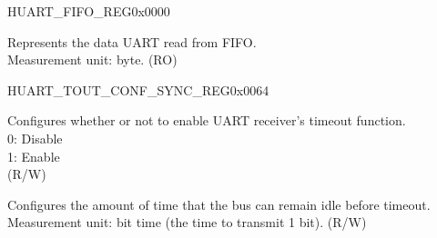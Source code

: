 \begin{register}{H}{UART\_FIFO\_REG}{0x0000}\label{regdesc:UARTFIFOREG}
%
%
\regnewline%
\begin{regdesc}\begin{reglist}
\label{fielddesc:UARTRXFIFORDBYTE}\item [UART\_RXFIFO\_RD\_BYTE] Represents the data UART  read from FIFO.\\
Measurement unit: byte. (RO)
\end{reglist}\end{regdesc}
\end{register}


\begin{register}{H}{UART\_TOUT\_CONF\_SYNC\_REG}{0x0064}\label{regdesc:UARTTOUTCONFSYNCREG}
%
%
%
%
\regnewline%
\begin{regdesc}\begin{reglist}
\label{fielddesc:UARTRXTOUTEN}\item [UART\_RX\_TOUT\_EN] Configures whether or not to enable UART receiver's timeout function.\\
0: Disable\\
1: Enable\\(R/W)
\label{fielddesc:UARTRXTOUTTHRHD}\item [UART\_RX\_TOUT\_THRHD] Configures the amount of time that the bus can remain idle before timeout.\\ Measurement unit: bit time (the time to transmit 1 bit). (R/W)
\end{reglist}\end{regdesc}
\end{register}


